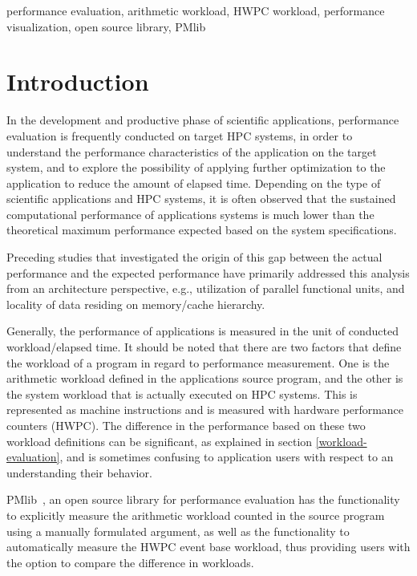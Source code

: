 \documentclass[conference]{IEEEtran}
\begin{document}
\begin{IEEEkeywords}
performance evaluation,
arithmetic workload,
HWPC workload,
performance visualization,
open source library,
PMlib
\end{IEEEkeywords}

\section{Introduction}
In the development and productive phase of scientific applications,
performance evaluation is frequently conducted on target HPC systems,
in order to understand the performance characteristics
of the application on the target system, and to explore the possibility of
applying further optimization to the application to reduce the amount of
elapsed time.
Depending on the type of scientific applications and HPC systems,
it is often observed that
the sustained computational performance of applications
systems is much lower than the theoretical maximum performance
expected based on the system specifications.

Preceding studies that investigated the origin of this gap between the actual
performance and the expected performance have primarily addressed this
analysis from an architecture perspective, e.g., 
utilization of parallel functional units,
and locality of data residing on memory/cache hierarchy.

Generally, the performance of applications is measured in the unit of
conducted workload/elapsed time.
It should be noted that there are two factors that define the workload
of a program in regard to performance measurement. 
One is the arithmetic workload defined in the applications source program,
and the other is the system workload that is actually executed on HPC systems.
This is represented as machine instructions and is measured with
hardware performance counters (HWPC).
The difference in the performance based on these two workload definitions
can be significant, as explained in section \ref{workload-evaluation},
and is sometimes confusing to application users with respect to an
understanding their behavior.

PMlib~\cite{PMlib:webpage-public}, an open source library for performance
evaluation has the functionality
to explicitly measure the arithmetic workload counted in the source program
using a manually formulated argument, as well as the functionality
to automatically measure the HWPC event base workload,
thus providing users with the option to compare the difference in workloads.
\end{document}
